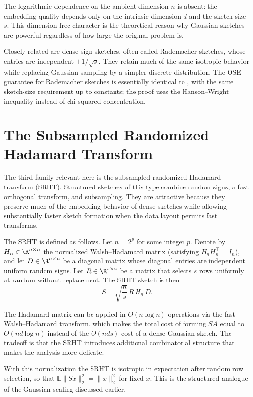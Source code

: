The logarithmic dependence on the ambient dimension \(n\) is absent: the embedding quality depends only on the intrinsic dimension \(d\) and the sketch size \(s\). This dimension-free character is the theoretical reason why Gaussian sketches are powerful regardless of how large the original problem is.

Closely related are dense sign sketches, often called Rademacher sketches, whose entries are independent \(\pm 1/\sqrt{s}\). They retain much of the same isotropic behavior while replacing Gaussian sampling by a simpler discrete distribution. The OSE guarantee for Rademacher sketches is essentially identical to , with the same sketch-size requirement up to constants; the proof uses the Hanson--Wright inequality instead of chi-squared concentration.

\section{The Subsampled Randomized Hadamard Transform}

The third family relevant here is the subsampled randomized Hadamard transform (SRHT). Structured sketches of this type combine random signs, a fast orthogonal transform, and subsampling. They are attractive because they preserve much of the embedding behavior of dense sketches while allowing substantially faster sketch formation when the data layout permits fast transforms.

The SRHT is defined as follows. Let \(n = 2^p\) for some integer \(p\). Denote by \(H_n \in \R^{n \times n}\) the normalized Walsh--Hadamard matrix (satisfying \(H_n H_n^\top = I_n\)), and let \(D \in \R^{n \times n}\) be a diagonal matrix whose diagonal entries are independent uniform random signs. Let \(R \in \R^{s \times n}\) be a matrix that selects \(s\) rows uniformly at random without replacement. The SRHT sketch is then
\[
	S = \sqrt{\frac{n}{s}}\, R\, H_n\, D.
\]

The Hadamard matrix can be applied in \(O(n\log n)\) operations via the fast Walsh--Hadamard transform, which makes the total cost of forming \(SA\) equal to \(O(nd\log n)\) instead of the \(O(nds)\) cost of a dense Gaussian sketch. The tradeoff is that the SRHT introduces additional combinatorial structure that makes the analysis more delicate.

With this normalization the SRHT is isotropic in expectation after random row
selection, so that \(\mathbb E\|Sx\|_2^2 = \|x\|_2^2\) for fixed \(x\). This is the
structured analogue of the Gaussian scaling discussed earlier.

